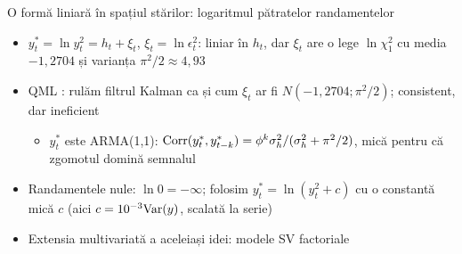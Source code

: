 \begin{frame}{O formă liniară în spațiul stărilor: logaritmul pătratelor randamentelor}
\itemsize{\small}
\begin{itemize}
    \item $y^*_t = \ln y^2_t = h_t + \xi_t$, $\xi_t = \ln\epsilon^2_t$: liniar în $h_t$, dar $\xi_t$ are o lege $\ln\chi^2_1$ cu media $-1{,}2704$ și varianța $\pi^2/2 \approx 4{,}93$
    \item QML : rulăm filtrul Kalman ca și cum $\xi_t$ ar fi $N(-1{,}2704; \pi^2/2)$; consistent, dar ineficient
    \begin{itemize}
        \item $y^*_t$ este ARMA(1,1): $\text{Corr}(y^*_t, y^*_{t-k}) = \phi^k\sigma^2_h/(\sigma^2_h + \pi^2/2)$, mică pentru că zgomotul domină semnalul
    \end{itemize}
    \item Randamentele nule: $\ln 0 = -\infty$; folosim $y^*_t = \ln(y^2_t + c)$ cu o constantă mică $c$ (aici $c = 10^{-3}\text{Var}(y)$, scalată la serie)
    \item Extensia multivariată a aceleiași idei: modele SV factoriale 
\end{itemize}
\end{frame}

